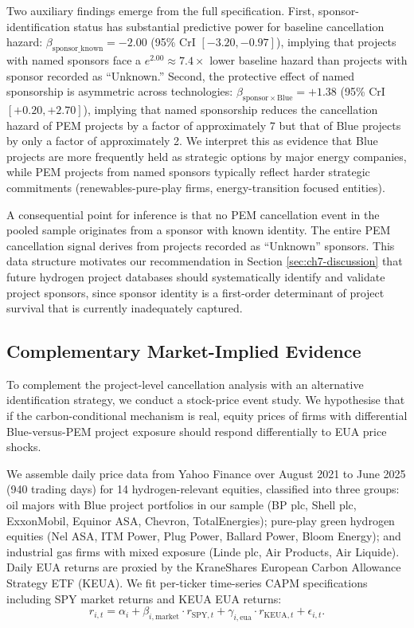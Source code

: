 \documentclass[11pt,a4paper]{article}
\begin{document}
Two auxiliary findings emerge from the full specification. First, sponsor-identification status has substantial predictive power for baseline cancellation hazard: $\beta_{\mathrm{sponsor\_known}} = -2.00$ (95\% CrI $[-3.20, -0.97]$), implying that projects with named sponsors face a $e^{2.00} \approx 7.4\times$ lower baseline hazard than projects with sponsor recorded as ``Unknown.'' Second, the protective effect of named sponsorship is asymmetric across technologies: $\beta_{\mathrm{sponsor} \times \mathrm{Blue}} = +1.38$ (95\% CrI $[+0.20, +2.70]$), implying that named sponsorship reduces the cancellation hazard of PEM projects by a factor of approximately 7 but that of Blue projects by only a factor of approximately 2. We interpret this as evidence that Blue projects are more frequently held as strategic options by major energy companies, while PEM projects from named sponsors typically reflect harder strategic commitments (renewables-pure-play firms, energy-transition focused entities).

A consequential point for inference is that no PEM cancellation event in the pooled sample originates from a sponsor with known identity. The entire PEM cancellation signal derives from projects recorded as ``Unknown'' sponsors. This data structure motivates our recommendation in Section \ref{sec:ch7-discussion} that future hydrogen project databases should systematically identify and validate project sponsors, since sponsor identity is a first-order determinant of project survival that is currently inadequately captured.


\subsection{Complementary Market-Implied Evidence}
\label{sec:ch7-event-study}

To complement the project-level cancellation analysis with an alternative identification strategy, we conduct a stock-price event study. We hypothesise that if the carbon-conditional mechanism is real, equity prices of firms with differential Blue-versus-PEM project exposure should respond differentially to EUA price shocks.

We assemble daily price data from Yahoo Finance over August 2021 to June 2025 (940 trading days) for 14 hydrogen-relevant equities, classified into three groups: oil majors with Blue project portfolios in our sample (BP plc, Shell plc, ExxonMobil, Equinor ASA, Chevron, TotalEnergies); pure-play green hydrogen equities (Nel ASA, ITM Power, Plug Power, Ballard Power, Bloom Energy); and industrial gas firms with mixed exposure (Linde plc, Air Products, Air Liquide). Daily EUA returns are proxied by the KraneShares European Carbon Allowance Strategy ETF (KEUA). We fit per-ticker time-series CAPM specifications including SPY market returns and KEUA EUA returns:
\begin{equation}
r_{i,t} = \alpha_i + \beta_{i,\mathrm{market}} \cdot r_{\mathrm{SPY},t} + \gamma_{i,\mathrm{eua}} \cdot r_{\mathrm{KEUA},t} + \epsilon_{i,t}.
\end{equation}
\end{document}
